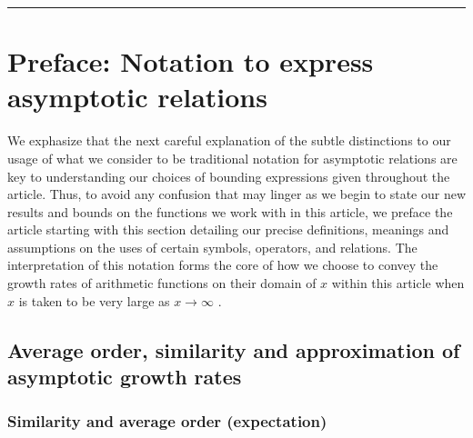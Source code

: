 \documentclass[11pt,reqno,a4letter]{article}
\numberwithin{figure}{section}
\numberwithin{table}{section}
\newcommand{\cf}{\textit{cf.\ }}
\theoremstyle{plain}
\numberwithin{theorem}{section}
\theoremstyle{definition}
\begin{document}
\bigskip\hrule\bigskip

\newpage
\label{Appendix_Glossary_NotationConvs}
     \vskip 0in
     \printglossary[type={symbols},
                    title={Reference on special notation and other conventions},
                    style={glossstyleSymbol},
                    nogroupskip=true]



\newpage
\section{Preface: Notation to express asymptotic relations} 

We exphasize that the next careful explanation of the subtle distinctions to our usage of 
what we consider to be traditional notation for asymptotic relations are key to 
understanding our choices of bounding expressions given throughout the article. 
Thus, to avoid any confusion that may linger as we begin to state our new results and bounds on the 
functions we work with in this article, we preface the article starting with this section detailing 
our precise definitions, meanings and assumptions on the uses of certain symbols, operators, and 
relations. The interpretation of this notation forms the core of how we choose 
to convey the growth rates of arithmetic functions on their domain of $x$ within this article 
when $x$ is taken to be very large as $x \rightarrow \infty$ 
\cite[\cf \S 2]{NISTHB} \cite{ACOMB-BOOK}. 

\subsection{Average order, similarity and approximation of asymptotic growth rates} 

\subsubsection{Similarity and average order (expectation)} 
\end{document}
